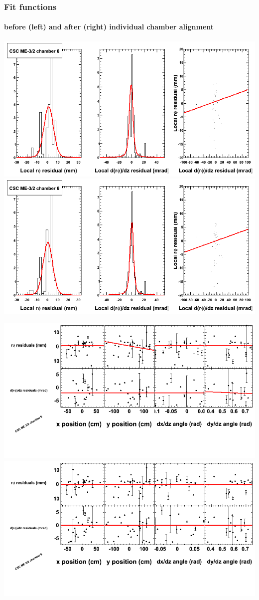 \documentclass[compress]{beamer}
\begin{document}
\begin{frame}
\frametitle{Fit functions}
\framesubtitle{before (left) and after (right) individual chamber alignment}
\includegraphics[width=0.5\linewidth]{ringfits_3dof/beforefit_MEm32_06_bellcurve.png} \includegraphics[width=0.5\linewidth]{ringfits_3dof/afterfit_MEm32_06_bellcurve.png}

\includegraphics[width=0.5\linewidth]{ringfits_3dof/beforefit_MEm32_06_polynomials.png} \includegraphics[width=0.5\linewidth]{ringfits_3dof/afterfit_MEm32_06_polynomials.png}
\end{frame}
\end{document}
